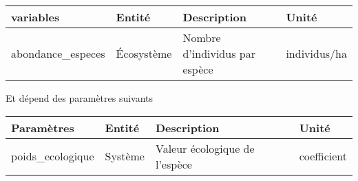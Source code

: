 \documentclass[
]{article}
\begin{document}
\begin{longtable}[]{@{}
  >{\raggedright\arraybackslash}p{}
  >{\raggedright\arraybackslash}p{}
  >{\raggedright\arraybackslash}p{}
  >{\raggedright\arraybackslash}p{}@{}}
\toprule\noalign{}
\begin{minipage}[b]{\linewidth}\raggedright
\textbf{variables}
\end{minipage} & \begin{minipage}[b]{\linewidth}\raggedright
\textbf{Entité}
\end{minipage} & \begin{minipage}[b]{\linewidth}\raggedright
\textbf{Description}
\end{minipage} & \begin{minipage}[b]{\linewidth}\raggedright
\textbf{Unité}
\end{minipage} \\
\midrule\noalign{}
\endhead
\bottomrule\noalign{}
\endlastfoot
abondance\_especes & Écosystème & Nombre d'individus par espèce &
individus/ha \\
\end{longtable}

Et dépend des paramètres suivants

\begin{longtable}[]{@{}
  >{\raggedright\arraybackslash}p{}
  >{\raggedright\arraybackslash}p{}
  >{\raggedright\arraybackslash}p{}
  >{\raggedright\arraybackslash}p{}@{}}
\toprule\noalign{}
\begin{minipage}[b]{\linewidth}\raggedright
\textbf{Paramètres}
\end{minipage} & \begin{minipage}[b]{\linewidth}\raggedright
\textbf{Entité}
\end{minipage} & \begin{minipage}[b]{\linewidth}\raggedright
\textbf{Description}
\end{minipage} & \begin{minipage}[b]{\linewidth}\raggedright
\textbf{Unité}
\end{minipage} \\
\midrule\noalign{}
\endhead
\bottomrule\noalign{}
\endlastfoot
poids\_ecologique & Système & Valeur écologique de l'espèce &
coefficient \\
\end{longtable}
\end{document}
